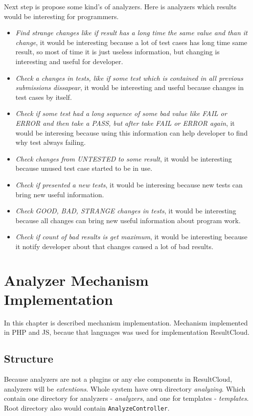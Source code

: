Next step is propose some kind's of analyzers. Here is analyzers which results would be interesting for programmers.
\begin{itemize} 
\item \emph{Find strange changes like if result has a long time the same value and than it change}, it would be interesting because a lot of test cases has long time same result, so most of time it is just useless information, but changing is interesting and useful for developer.
\item \emph{Check a changes in tests, like if some test which is contained in all previous submissions dissapear}, it would be interesting and useful because changes in test cases by itself.
\item \emph{Check if some test had a long sequence of some bad value like FAIL or ERROR and then take a PASS, but after take FAIL or ERROR again}, it would be interesing because using this information can help developer to find why test always failing.
\item \emph{Check changes from UNTESTED to some result}, it would be interesting because unused test case started to be in use.
\item \emph{Check if presented a new tests}, it would be interesing because new tests can bring new useful information.
\item \emph{Check GOOD, BAD, STRANGE changes in tests}, it would be interesting because all changes can bring new useful information about program work. 
\item \emph{Check if count of bad results is get maximum}, it would be interesting because it notify developer about that changes caused a lot of bad results.
\end{itemize}

\chapter{Analyzer Mechanism Implementation}
\label{ch:analyzer_implement}

In this chapter is described mechanism implementation. Mechanism implemented in PHP and JS, becaue that languages was used for implementation ResultCloud.

\section{Structure}

Because analyzers are not a plugins or any else components in ResultCloud, analyzers will be \emph{extentions}. Whole system have own directory \emph{analyzing}. Which contain one directory for analyzers - \emph{analyzers}, and one for templates - \emph{templates}. Root directory also would contain \texttt{AnalyzeController}.


